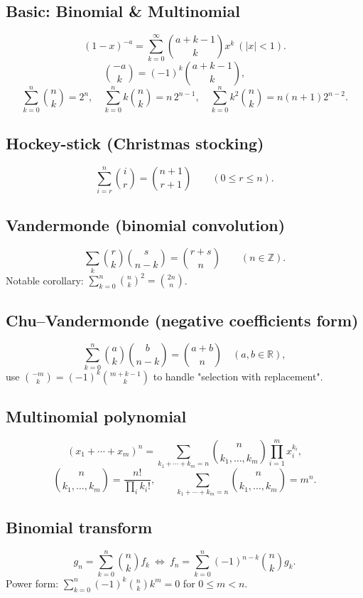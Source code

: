 
\subsection*{Basic: Binomial \& Multinomial}
\[
(1-x)^{-a}=\sum_{k=0}^\infty \binom{a+k-1}{k}x^k \ (|x|<1).
\]
\[
\binom{-a}{k}=(-1)^k\binom{a+k-1}{k},\qquad
\]
\[
\sum_{k=0}^n \binom{n}{k}=2^n,\quad
\sum_{k=0}^n k\binom{n}{k}=n\,2^{n-1},\quad
\sum_{k=0}^n k^2\binom{n}{k}=n(n+1)2^{n-2}.
\]

\subsection*{Hockey-stick (Christmas stocking)}
\[
\sum_{i=r}^{n}\binom{i}{r}=\binom{n+1}{r+1}\qquad (0\le r\le n).
\]

\subsection*{Vandermonde (binomial convolution)}
\[
\sum_{k}\binom{r}{k}\binom{s}{n-k}=\binom{r+s}{\,n\,}\qquad (n\in\mathbb{Z}).
\]
Notable corollary: \(\displaystyle \sum_{k=0}^n \binom{n}{k}^2=\binom{2n}{n}\).

\subsection*{Chu–Vandermonde (negative coefficients form)}
\[
\sum_{k=0}^n \binom{a}{k}\binom{b}{n-k}=\binom{a+b}{n}\quad(a,b\in\mathbb{R}),
\]
use \(\binom{-m}{k}=(-1)^k\binom{m+k-1}{k}\) to handle "selection with replacement".

\subsection*{Multinomial polynomial}
\[
(x_1+\cdots+x_m)^n=\sum_{k_1+\cdots+k_m=n}\binom{n}{k_1,\dots,k_m}\prod_{i=1}^m x_i^{k_i},
\]
\[
\binom{n}{k_1,\dots,k_m}=\frac{n!}{\prod_i k_i!},\qquad
\sum_{k_1+\cdots+k_m=n}\binom{n}{k_1,\dots,k_m}=m^n.
\]

\subsection*{Binomial transform}
\[
g_n=\sum_{k=0}^n \binom{n}{k}f_k
\ \Longleftrightarrow\
f_n=\sum_{k=0}^n (-1)^{n-k}\binom{n}{k}g_k.
\]
Power form: \(\displaystyle \sum_{k=0}^n (-1)^k\binom{n}{k}k^m=0\) for \(0\le m<n\).

